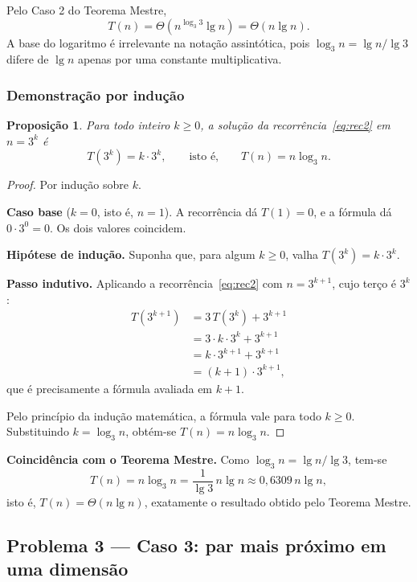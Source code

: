 \documentclass[11pt,a4paper]{article}
\newtheorem{proposicao}{Proposição}
\begin{document}
Pelo Caso 2 do Teorema Mestre,
\[
\boxed{T(n)=\Theta\!\left(n^{\log_3 3}\lg n\right)=\Theta(n\lg n).}
\]
A base do logaritmo é irrelevante na notação assintótica, pois $\log_3 n=\lg n/\lg 3$ difere de $\lg n$ apenas por uma constante multiplicativa.

\subsubsection{Demonstração por indução}

\begin{proposicao}
\label{prop:p2}
Para todo inteiro $k\ge0$, a solução da recorrência~\eqref{eq:rec2} em $n=3^k$ é
\[
T(3^k)=k\cdot3^k,\qquad\text{isto é,}\qquad T(n)=n\log_3 n.
\]
\end{proposicao}

\begin{proof}
Por indução sobre $k$.

\textbf{Caso base} ($k=0$, isto é, $n=1$). A recorrência dá $T(1)=0$, e a fórmula dá $0\cdot3^0=0$. Os dois valores coincidem.

\textbf{Hipótese de indução.} Suponha que, para algum $k\ge0$, valha $T(3^k)=k\cdot3^k$.

\textbf{Passo indutivo.} Aplicando a recorrência~\eqref{eq:rec2} com $n=3^{k+1}$, cujo terço é $3^k$:
\begin{align*}
T(3^{k+1})&=3\,T(3^k)+3^{k+1}\\
&=3\cdot k\cdot3^k+3^{k+1}\\
&=k\cdot3^{k+1}+3^{k+1}\\
&=(k+1)\cdot3^{k+1},
\end{align*}
que é precisamente a fórmula avaliada em $k+1$.

Pelo princípio da indução matemática, a fórmula vale para todo $k\ge0$. Substituindo $k=\log_3 n$, obtém-se $T(n)=n\log_3 n$.
\end{proof}

\textbf{Coincidência com o Teorema Mestre.} Como $\log_3 n=\lg n/\lg 3$, tem-se
\begin{equation}
T(n)=n\log_3 n=\frac{1}{\lg 3}\,n\lg n\approx0{,}6309\,n\lg n,
\label{eq:fechada2}
\end{equation}
isto é, $T(n)=\Theta(n\lg n)$, exatamente o resultado obtido pelo Teorema Mestre.

\subsection{Problema 3 --- Caso 3: par mais próximo em uma dimensão}
\end{document}
